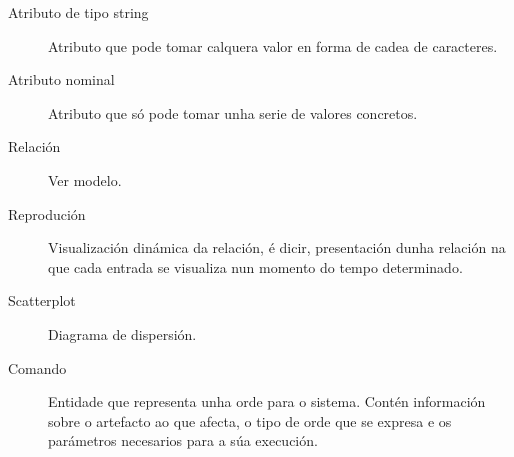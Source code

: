 \begin{description}
	\item[Atributo de tipo string] \hfill
  Atributo que pode tomar calquera valor en forma de cadea de caracteres.
	\item[Atributo nominal] \hfill
  Atributo que só pode tomar unha serie de valores concretos.
	\item[Relación] \hfill
 Ver modelo.
\item[Reprodución] \hfill
 Visualización dinámica da relación, é dicir, presentación dunha relación na que cada entrada se visualiza nun momento do tempo determinado.
\item[Scatterplot] \hfill
 Diagrama de dispersión.
\item[Comando] \hfill
 Entidade que representa unha orde para o sistema. Contén información sobre o artefacto ao que afecta, o tipo de orde que se expresa e os parámetros necesarios para a súa execución.
\end{description}